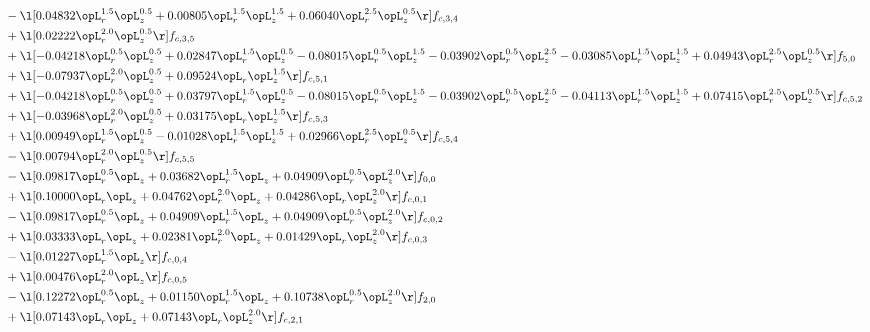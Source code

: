 \begin{alignat}{2}
& - \l[  0.04832 \opL_r^{1.5} \opL_z^{0.5} +  0.00805 \opL_r^{1.5} \opL_z^{1.5} +  0.06040 \opL_r^{2.5} \opL_z^{0.5}  \r] f_{c,3,4} \nonumber \\ 
& + \l[  0.02222 \opL_r^{2.0} \opL_z^{0.5}  \r] f_{c,3,5} \nonumber \\ 
& + \l[  -0.04218 \opL_r^{0.5} \opL_z^{0.5} +  0.02847 \opL_r^{1.5} \opL_z^{0.5}   -0.08015 \opL_r^{0.5} \opL_z^{1.5}   -0.03902 \opL_r^{0.5} \opL_z^{2.5}   -0.03085 \opL_r^{1.5} \opL_z^{1.5} +  0.04943 \opL_r^{2.5} \opL_z^{0.5}  \r] f_{5,0} \nonumber \\ 
& + \l[  -0.07937 \opL_r^{2.0} \opL_z^{0.5} +  0.09524 \opL_r \opL_z^{1.5}  \r] f_{c,5,1} \nonumber \\ 
& + \l[  -0.04218 \opL_r^{0.5} \opL_z^{0.5} +  0.03797 \opL_r^{1.5} \opL_z^{0.5}   -0.08015 \opL_r^{0.5} \opL_z^{1.5}   -0.03902 \opL_r^{0.5} \opL_z^{2.5}   -0.04113 \opL_r^{1.5} \opL_z^{1.5} +  0.07415 \opL_r^{2.5} \opL_z^{0.5}  \r] f_{c,5,2} \nonumber \\ 
& + \l[  -0.03968 \opL_r^{2.0} \opL_z^{0.5} +  0.03175 \opL_r \opL_z^{1.5}  \r] f_{c,5,3} \nonumber \\ 
& + \l[  0.00949 \opL_r^{1.5} \opL_z^{0.5}   -0.01028 \opL_r^{1.5} \opL_z^{1.5} +  0.02966 \opL_r^{2.5} \opL_z^{0.5}  \r] f_{c,5,4} \nonumber \\ 
& - \l[  0.00794 \opL_r^{2.0} \opL_z^{0.5}  \r] f_{c,5,5} \nonumber \\ 
& - \l[  0.09817 \opL_r^{0.5} \opL_z +  0.03682 \opL_r^{1.5} \opL_z +  0.04909 \opL_r^{0.5} \opL_z^{2.0}  \r] f_{0,0} \nonumber \\ 
& + \l[  0.10000 \opL_r \opL_z +  0.04762 \opL_r^{2.0} \opL_z +  0.04286 \opL_r \opL_z^{2.0}  \r] f_{c,0,1} \nonumber \\ 
& - \l[  0.09817 \opL_r^{0.5} \opL_z +  0.04909 \opL_r^{1.5} \opL_z +  0.04909 \opL_r^{0.5} \opL_z^{2.0}  \r] f_{c,0,2} \nonumber \\ 
& + \l[  0.03333 \opL_r \opL_z +  0.02381 \opL_r^{2.0} \opL_z +  0.01429 \opL_r \opL_z^{2.0}  \r] f_{c,0,3} \nonumber \\ 
& - \l[  0.01227 \opL_r^{1.5} \opL_z  \r] f_{c,0,4} \nonumber \\ 
& + \l[  0.00476 \opL_r^{2.0} \opL_z  \r] f_{c,0,5} \nonumber \\ 
& - \l[  0.12272 \opL_r^{0.5} \opL_z +  0.01150 \opL_r^{1.5} \opL_z +  0.10738 \opL_r^{0.5} \opL_z^{2.0}  \r] f_{2,0} \nonumber \\ 
& + \l[  0.07143 \opL_r \opL_z +  0.07143 \opL_r \opL_z^{2.0}  \r] f_{c,2,1} \nonumber \\ 

\end{alignat}

